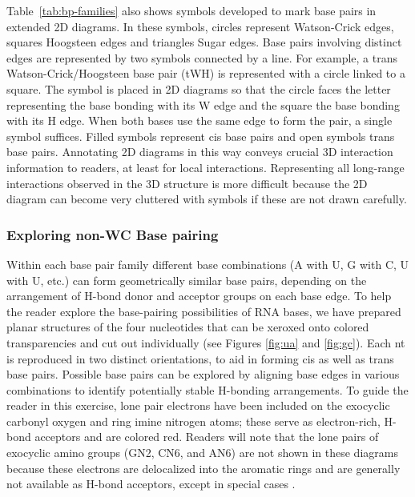 Table~\ref{tab:bp-families} also shows symbols developed to mark base pairs in extended 2D diagrams.
In these symbols, circles represent Watson-Crick edges, squares Hoogsteen edges
and triangles Sugar edges. Base pairs involving distinct edges are represented
by two symbols connected by a line. For example, a trans Watson-Crick/Hoogsteen
base pair (tWH) is represented with a circle linked to a square. The symbol is
placed in 2D diagrams so that the circle faces the letter representing the base
bonding with its W edge and the square the base bonding with its H edge. When
both bases use the same edge to form the pair, a single symbol suffices. Filled
symbols represent cis base pairs and open symbols trans base pairs. Annotating
2D diagrams in this way conveys crucial 3D interaction information to readers,
at least for local interactions. Representing all long-range interactions
observed in the 3D structure is more difficult because the 2D diagram can become
very cluttered with symbols if these are not drawn carefully. 

\subsubsection{Exploring non-WC Base pairing}

Within each base pair family different base combinations (A with U, G with C, U
with U, etc.) can form geometrically similar base pairs, depending on the
arrangement of H-bond donor and acceptor groups on each base edge. To help the
reader explore the base-pairing possibilities of RNA bases, we have prepared
planar structures of the four nucleotides that can be xeroxed onto colored
transparencies and cut out individually (see Figures \ref{fig:ua} and
\ref{fig:gc}). Each nt is reproduced in two distinct orientations, to aid in
forming cis as well as trans base pairs. Possible base pairs can be explored by
aligning base edges in various combinations to identify potentially stable
H-bonding arrangements. To guide the reader in this exercise, lone pair
electrons have been included on the exocyclic carbonyl oxygen and ring imine
nitrogen atoms; these serve as electron-rich, H-bond acceptors and are colored
red. Readers will note that the lone pairs of exocyclic amino groups (GN2, CN6,
and AN6) are not shown in these diagrams because these electrons are delocalized
into the aromatic rings and are generally not available as H-bond acceptors,
except in special cases \cite{Zirbel2009, Sponer2003}.

